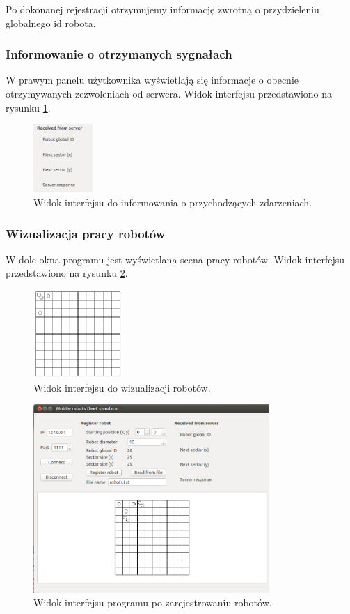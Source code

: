 	Po dokonanej rejestracji otrzymujemy informację zwrotną o przydzieleniu globalnego id robota.
	
	\subsubsection{Informowanie o otrzymanych sygnałach}
	
	W prawym panelu użytkownika wyświetlają się informacje o obecnie otrzymywanych zezwoleniach od serwera.	 Widok interfejsu przedstawiono na rysunku \ref{fig:zdarzenia}.
	
		\begin{figure}[!htp]
  			\centering
		  	\includegraphics[width=0.2\textwidth]{img/sygnaly.png}
  			\caption{Widok interfejsu do informowania o przychodzących zdarzeniach.}
  			\label{fig:zdarzenia}
		\end{figure}
	
	\subsubsection{Wizualizacja pracy robotów}
	
	W dole okna programu jest wyświetlana scena pracy robotów. Widok interfejsu przedstawiono na rysunku \ref{fig:wizualizacja}.
	
		\begin{figure}[!htp]
  			\centering
		  	\includegraphics[width=0.3\textwidth]{img/wizualizacja.png}
  			\caption{Widok interfejsu do wizualizacji robotów.}
  			\label{fig:wizualizacja}
		\end{figure}



\begin{figure}[!htp]
  \centering
  \includegraphics[width=0.8\textwidth]{img/klient_robot.png}
  \caption{Widok interfejsu programu po zarejestrowaniu robotów.}
  \label{fig:int_rej}
\end{figure}